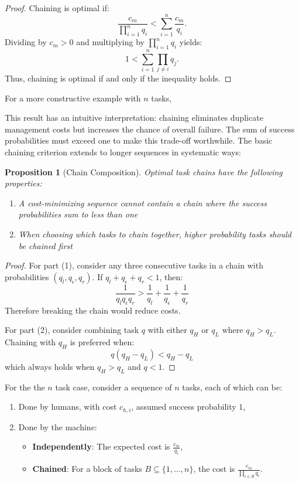 \documentclass{article}
\newtheorem{proposition}[theorem]{Proposition}
\begin{document}
  \begin{proof}
  Chaining is optimal if:
  \[
  \frac{c_m}{\prod_{i=1}^n q_i} < \sum_{i=1}^n \frac{c_m}{q_i}.
  \]
  Dividing by \(c_m > 0\) and multiplying by \(\prod_{i=1}^n q_i\) yields:
  \[
  1 < \sum_{i=1}^n \prod_{j \neq i} q_j.
  \]
  Thus, chaining is optimal if and only if the inequality holds.
  \end{proof}

For a more constructive example with $n$ tasks, 

This result has an intuitive interpretation: chaining eliminates duplicate management costs but increases the chance of overall failure.
The sum of success probabilities must exceed one to make this trade-off worthwhile.
The basic chaining criterion extends to longer sequences in systematic ways:

\begin{proposition}[Chain Composition]
Optimal task chains have the following properties:
\begin{enumerate}
\item A cost-minimizing sequence cannot contain a chain where the success probabilities sum to less than one
\item When choosing which tasks to chain together, higher probability tasks should be chained first
\end{enumerate}
\end{proposition}

\begin{proof}
For part (1), consider any three consecutive tasks in a chain with probabilities $(q_l, q_\epsilon, q_r)$.
If $q_l + q_\epsilon + q_r < 1$, then:
\[\frac{1}{q_lq_\epsilon q_r} > \frac{1}{q_l} + \frac{1}{q_\epsilon} + \frac{1}{q_r}\]
Therefore breaking the chain would reduce costs.

For part (2), consider combining task $q$ with either $q_H$ or $q_L$ where $q_H > q_L$.
Chaining with $q_H$ is preferred when:
\[q(q_H - q_L) < q_H - q_L\]
which always holds when $q_H > q_L$ and $q < 1$.
\end{proof}

For the the $n$ task case, consider a sequence of \(n\) tasks, each of which can be:
\begin{enumerate}
    \item Done by humans, with cost \(c_{h,i}\), assumed success probability \(1\),
    \item Done by the machine:
    \begin{itemize}
        \item \textbf{Independently}: The expected cost is \(\frac{c_m}{q_i}\),
        \item \textbf{Chained}: For a block of tasks \(B \subseteq \{1, \dots, n\}\), the cost is \(\frac{c_m}{\prod_{i \in B} q_i}\).
    \end{itemize}
\end{enumerate}
\end{document}
